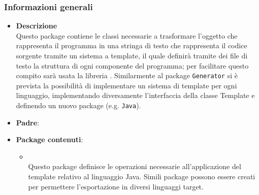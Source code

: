 \subsubsection{Informazioni generali}
\begin{itemize}
\item \textbf{Descrizione}\\
Questo package contiene le classi necessarie a trasformare l'oggetto che rappresenta il programma in una stringa di testo che rappresenta il codice sorgente tramite un sistema a template, il quale definirà tramite dei file di testo la struttura di ogni componente del programma; per facilitare questo compito sarà usata la libreria \stringtemplate{}. Similarmente al package \texttt{Generator} si è prevista la possibilità di implementare un sistema di template per ogni linguaggio, implementando diversamente l'interfaccia della classe Template e definendo un nuovo package (e.g. \texttt{Java}).
\item \textbf{Padre}: \hyperref[\nogloxy{swedesigner::server}]{}
\item \textbf{Package contenuti}:
\begin{itemize}
\item \hyperref[\nogloxy{swedesigner::server::template::java}]{}\\
Questo package definisce le operazioni necessarie all'applicazione del template relativo al linguaggio Java. Simili package possono essere creati per permettere l'esportazione in diversi linguaggi target.
\end{itemize}
\end{itemize}
